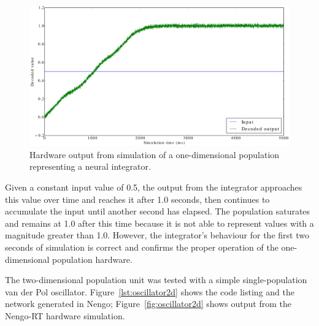 \documentclass[english]{article}
\newcommand{\design}{Nengo-RT}
\begin{document}
\begin{figure}
\centering

\includegraphics[width=6in]{integrator-1d.eps} %

\caption[Simulation of a 1D neural integrator.]
{Hardware output from simulation of a one-dimensional population representing a neural integrator.}

\label{fig:integrator1d}
\end{figure}

Given a constant input value of 0.5, the output from the integrator approaches this value
over time and reaches it after 1.0 seconds, then continues to accumulate the input until
another second has elapsed. The population saturates and remains at 1.0 after this time
because it is not able to represent values with a magnitude greater than 1.0. However,
the integrator's behaviour for the first two seconds of simulation is correct and confirms
the proper operation of the one-dimensional population hardware.

The two-dimensional population unit was tested with a simple single-population van der Pol oscillator.
Figure~\ref{lst:oscillator2d} shows the code listing and the network generated in Nengo;
Figure~\ref{fig:oscillator2d} shows output from the \design{} hardware simulation.
\end{document}
